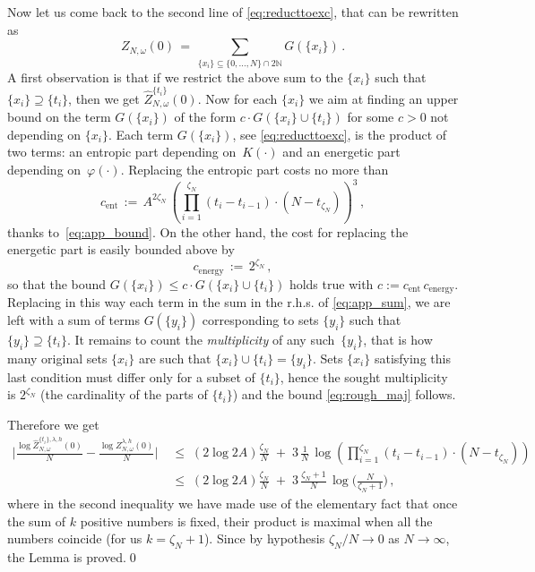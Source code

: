 \documentclass[reqno,11pt]{amsart}
\numberwithin{equation}{section}
\newcommand{\N}{\mathbb{N}}
\newcommand{\go}{\omega}
\newcommand{\gl}{\lambda}
\begin{document}
Now let us come back to the second line of \eqref{eq:reducttoexc}, that can be rewritten as
\begin{equation}
\label{eq:app_sum}
Z_{N,\go}(0) \,=\, \sum_{\{x_i\} \subseteq \{0, \ldots, N\} \cap 2\N} G(\{x_i\})\,.
\end{equation}
A first observation is that if we restrict the above sum  to the $\{x_i\}$ such that
$\{x_i\} \supseteq \{t_i\}$, then we  get  $\widehat{Z}_{N,\go}^{\{t_i\}}(0)$. Now for each $\{x_i\}$ we
aim at finding an  upper bound on the term $G(\{x_i\})$ of the form
 $c \cdot G(\{x_i\} \cup \{t_i\})$ for some $c>0$ not depending on $\{x_i\}$.
 Each term $G(\{x_i\})$, see \eqref{eq:reducttoexc}, is the product of two terms: an entropic part depending on~$K(\cdot)$ and an energetic part depending on~$\varphi(\cdot)$. Replacing the entropic part costs no more than
\begin{equation}
    c_{\text{ent}} \, :=\,  A^{2\zeta_N} \, \left( \prod_{i=1}^{\zeta_N} (t_i-t_{i-1}) \cdot (N-t_{\zeta_N}) \right)^{3}\,,
\end{equation}
thanks to~\eqref{eq:app_bound}. On the other hand, the cost for replacing the energetic part is easily
bounded above by
\begin{equation}
    c_{\text{energy}} \, :=\, 2^{\zeta_N}\,,
\end{equation}
so that the bound $G(\{x_i\}) \le c \cdot G(\{x_i\} \cup \{t_i\})$ holds true with $c:= c_{\text{ent}} \, c_{\text{energy}}$. Replacing in this way each term in the sum in the r.h.s. of \eqref{eq:app_sum}, we are left with a sum of terms $G(\{y_i\})$ corresponding to sets $\{y_i\}$ such that $\{y_i\} \supseteq \{t_i\}$. It remains to count the {\sl multiplicity} of any such~$\{y_i\}$, that is how many original sets $\{x_i\}$ are such that $\{x_i\} \cup \{t_i\} = \{y_i\}$. Sets $\{x_{i}\}$ satisfying this last condition must differ only for a subset of $\{t_{i}\}$, hence the sought multiplicity is $2^{\zeta_N}$ (the cardinality of the parts of $\{t_{i}\}$) and the bound \eqref{eq:rough_maj} follows.

Therefore we get
\begin{align}
\bigg| \frac{\log \widehat{Z}_{N,\go}^{\{t_i\},\gl,h}(0)}{N}  -  \frac{\log Z_{N,\go}^{\gl,h}(0)}{N} \bigg| & \;\le\; (2\log 2 A) \frac{\zeta_N}{N} \;+\; 3\, \frac{1}{N} \,\log \left( \prod_{i=1}^{\zeta_N} (t_i-t_{i-1}) \cdot (N-t_{\zeta_N}) \right) \\
&\;\le\; (2\log 2A) \frac{\zeta_N}{N} \;+\; 3 \, \frac{\zeta_N+1}{N} \, \log \bigg(\frac{N}{\zeta_N+1}\bigg)\,,
\nonumber
\end{align}
where in the second inequality we have made use of the elementary fact that once the sum of $k$ positive numbers is fixed, their product is maximal when all the numbers coincide (for us $k=\zeta_N+1$). Since by hypothesis $\zeta_N/N \to 0$ as $N\to\infty$, the Lemma is proved.\qed
\end{document}
